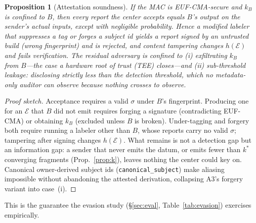 \documentclass[conference,compsoc]{IEEEtran}
\newtheorem{proposition}{Proposition}
\begin{document}
\begin{proposition}[Attestation soundness]\label{prop:attest}
If the MAC is \textup{EUF-CMA}-secure and $k_B$ is confined to $B$, then
every report the center accepts equals $B$'s output on the sender's actual inputs,
except with negligible probability. Hence a modified labeler that suppresses a tag or
forges a subject id yields a report signed by an untrusted build (wrong fingerprint)
and is rejected, and content tampering changes $h(\mathcal{E})$ and fails
verification. The residual adversary is confined to (i) exfiltrating $k_B$ from
$B$---the case a hardware root of trust (TEE) closes---and (ii) \emph{sub-threshold}
leakage: disclosing strictly less than the detection threshold, which no
metadata-only auditor can observe because nothing crosses to observe.
\end{proposition}
\begin{proof}[Proof sketch]
Acceptance requires a valid $\sigma$ under $B$'s fingerprint. Producing one for an
$\mathcal{E}$ that $B$ did not emit requires forging a signature (contradicting
EUF-CMA) or obtaining $k_B$ (excluded unless $B$ is broken). Under-tagging and forgery
both require running a labeler other than $B$, whose reports carry no valid $\sigma$;
tampering after signing changes $h(\mathcal{E})$. What remains is not a detection gap
but an information gap: a sender that never emits the datum, or emits fewer than
$k^{*}$ converging fragments (Prop.~\ref{prop:k}), leaves nothing the center could key
on. Canonical owner-derived subject ids (\texttt{canonical\_subject}) make aliasing
impossible without abandoning the attested derivation, collapsing A3's forgery variant
into case~(i).
\end{proof}

\noindent This is the guarantee the evasion study (\S\ref{sec:eval},
Table~\ref{tab:evasion}) exercises empirically.
\end{document}
